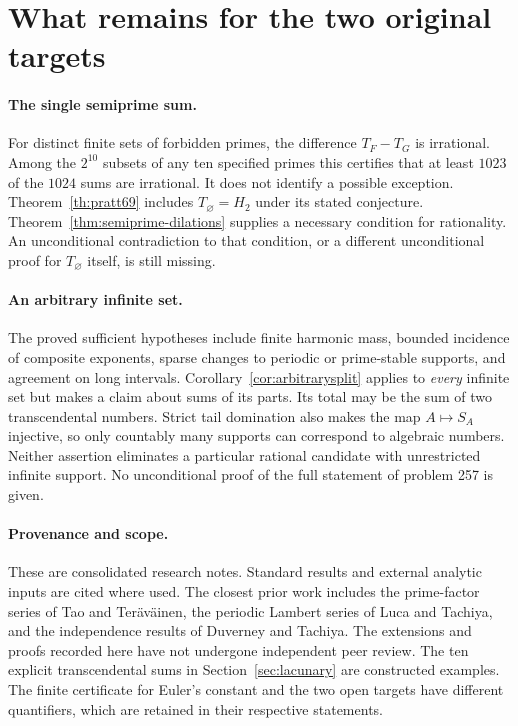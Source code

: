 \documentclass[11pt,letterpaper]{article}
\begin{document}
\section{What remains for the two original targets}\label{sec:scope}
\paragraph{The single semiprime sum.}
For distinct finite sets of forbidden primes, the difference $T_F-T_G$
is irrational. Among the $2^{10}$ subsets of any ten specified primes
this certifies that at least $1023$ of the $1024$ sums are irrational.
It does not identify a possible exception. Theorem~\ref{th:pratt69}
includes $T_\varnothing=H_2$ under its stated conjecture.
Theorem~\ref{thm:semiprime-dilations} supplies a necessary condition for
rationality. An unconditional contradiction to that condition, or a
different unconditional proof for $T_\varnothing$ itself, is still missing.

\paragraph{An arbitrary infinite set.}
The proved sufficient hypotheses include finite harmonic mass,
bounded incidence of composite exponents, sparse changes to periodic
or prime-stable supports, and agreement on long intervals.
Corollary~\ref{cor:arbitrarysplit} applies to \emph{every} infinite
set but makes a claim about sums of its parts. Its total may be the sum
of two transcendental numbers. Strict tail domination also makes the
map $A\mapsto S_A$ injective, so only countably many supports can
correspond to algebraic numbers. Neither assertion eliminates a
particular rational candidate with unrestricted infinite support.
No unconditional proof of the full statement of problem 257 is given.

\paragraph{Provenance and scope.}
These are consolidated research notes. Standard results and external
analytic inputs are cited where used. The closest prior work includes
the prime-factor series of Tao and Ter\"av\"ainen, the periodic Lambert
series of Luca and Tachiya, and the independence results of Duverney
and Tachiya. The extensions and proofs recorded here have not undergone
independent peer review. The ten explicit transcendental sums in
Section~\ref{sec:lacunary} are constructed examples. The finite
certificate for Euler's constant and the two open targets have
different quantifiers, which are retained in their respective statements.
\end{document}
